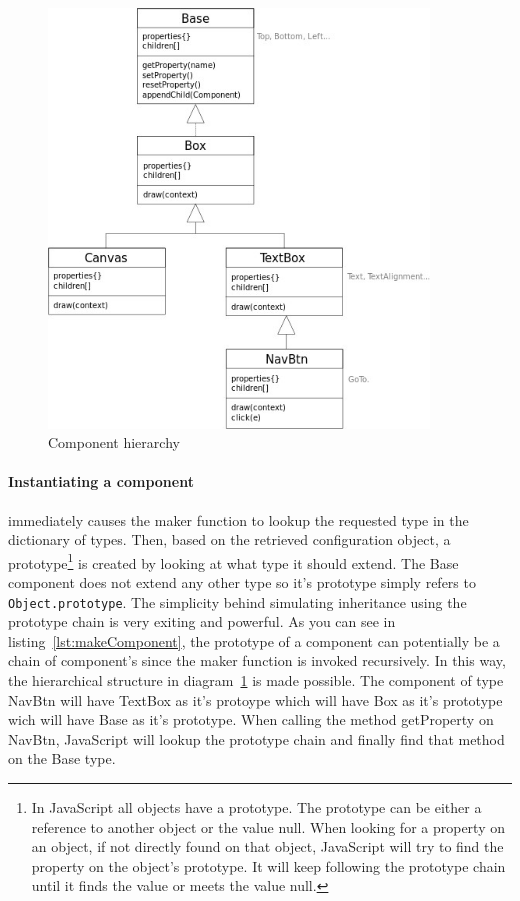 \begin{figure}
    \centering
    \includegraphics[width=0.9\textwidth]{images/components_uml.jpg}
    \caption{Component hierarchy}
    \label{img:componentsUML}
\end{figure}



\paragraph{Instantiating a component} immediately causes the maker function to lookup the requested type in the dictionary of types. Then, based on the retrieved configuration object, a prototype\footnote{In JavaScript all objects have a prototype. The prototype can be either a reference to another object or the value null. When looking for a property on an object, if not directly found on that object, JavaScript will try to find the property on the object's prototype. It will keep following the prototype chain until it finds the value or meets the value null.} is created by looking at what type it should extend. The Base component does not extend any other type so it's prototype simply refers to \texttt{Object.prototype}. The simplicity behind simulating inheritance using the prototype chain is very exiting and powerful. As you can see in listing~\ref{lst:makeComponent}, the prototype of a component can potentially be a chain of component's since the maker function is invoked recursively. In this way, the hierarchical structure in diagram~\ref{img:componentsUML} is made possible. The component of type NavBtn will have TextBox as it's protoype which will have Box as it's prototype wich will have Base as it's prototype. When calling the method getProperty on NavBtn, JavaScript will lookup the prototype chain and finally find that method on the Base type.

